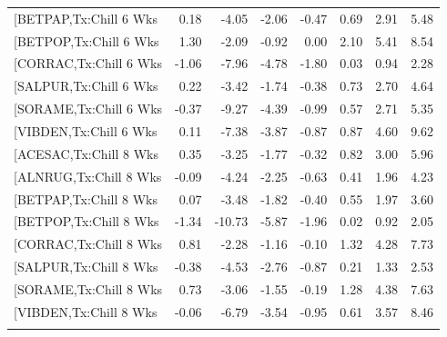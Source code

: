 \documentclass{article}\usepackage[]{graphicx}\usepackage[]{color}
\begin{document}
\begin{longtable}{lrrrrrrr}
  [BETPAP,Tx:Chill 6 Wks & 0.18 & -4.05 & -2.06 & -0.47 & 0.69 & 2.91 & 5.48 \\ 
  [BETPOP,Tx:Chill 6 Wks & 1.30 & -2.09 & -0.92 & 0.00 & 2.10 & 5.41 & 8.54 \\ 
  [CORRAC,Tx:Chill 6 Wks & -1.06 & -7.96 & -4.78 & -1.80 & 0.03 & 0.94 & 2.28 \\ 
  [SALPUR,Tx:Chill 6 Wks & 0.22 & -3.42 & -1.74 & -0.38 & 0.73 & 2.70 & 4.64 \\ 
  [SORAME,Tx:Chill 6 Wks & -0.37 & -9.27 & -4.39 & -0.99 & 0.57 & 2.71 & 5.35 \\ 
  [VIBDEN,Tx:Chill 6 Wks & 0.11 & -7.38 & -3.87 & -0.87 & 0.87 & 4.60 & 9.62 \\ 
  [ACESAC,Tx:Chill 8 Wks & 0.35 & -3.25 & -1.77 & -0.32 & 0.82 & 3.00 & 5.96 \\ 
  [ALNRUG,Tx:Chill 8 Wks & -0.09 & -4.24 & -2.25 & -0.63 & 0.41 & 1.96 & 4.23 \\ 
  [BETPAP,Tx:Chill 8 Wks & 0.07 & -3.48 & -1.82 & -0.40 & 0.55 & 1.97 & 3.60 \\ 
  [BETPOP,Tx:Chill 8 Wks & -1.34 & -10.73 & -5.87 & -1.96 & 0.02 & 0.92 & 2.05 \\ 
  [CORRAC,Tx:Chill 8 Wks & 0.81 & -2.28 & -1.16 & -0.10 & 1.32 & 4.28 & 7.73 \\ 
  [SALPUR,Tx:Chill 8 Wks & -0.38 & -4.53 & -2.76 & -0.87 & 0.21 & 1.33 & 2.53 \\ 
  [SORAME,Tx:Chill 8 Wks & 0.73 & -3.06 & -1.55 & -0.19 & 1.28 & 4.38 & 7.63 \\ 
  [VIBDEN,Tx:Chill 8 Wks & -0.06 & -6.79 & -3.54 & -0.95 & 0.61 & 3.57 & 8.46 \\ 
   \hline
\hline
\label{tab:suppmodmeri}
\end{longtable}
\end{document}
